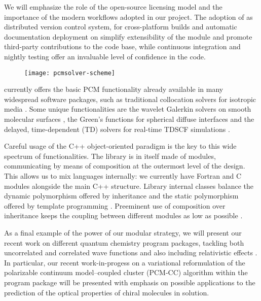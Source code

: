 We will emphasize the role of the open-source licensing model and the
importance of the modern workflows adopted in our project.  The adoption
of \git as distributed version control system, \cmake for cross-platform builds and automatic
documentation deployment on \readthedocs simplify extensibility of the
module and promote third-party contributions to the code base, while
continuous integration and nightly testing offer an invaluable level of
confidence in the code.

\begin{figure}[!htb]
  \centering
  \texttt{[image: pcmsolver-scheme]}
\end{figure}

\pcmsolver currently offers the basic PCM functionality already
available in many widespread software packages, such as traditional
collocation solvers for isotropic media \cite{Tomasi2005}.  Some unique
functionalities are the wavelet Galerkin solvers on smooth molecular
surfaces \cite{Weijo2010, Bugeanu2015}, the Green’s
functions for spherical diffuse interfaces \cite{Mozgawa2015}
and the delayed, time-dependent (TD) solvers for real-time TDSCF
simulations \cite{Corni2015}.

Careful usage of the C++ object-oriented paradigm is the key to this
wide spectrum of functionalities. The library is in itself made of
modules, communicating by means of composition at the outermost
level of the design.
This allows us to mix languages internally: we currently have Fortran
and C modules alongside the main C++ structure.
Library internal classes balance the dynamic polymorphism offered by
inheritance and the static polymorphism offered by template programming
\cite{Alexandrescu2001, Sutter2004}.
Preeminent use of composition over inheritance keeps the coupling
between different modules as low as possible \cite{Gamma1994}.

As a final example of the power of our modular strategy, we will present
our recent work on different quantum chemistry program packages,
tackling both uncorrelated and correlated wave functions \cite{DALTON,
PSI4} and also including relativistic effects \cite{DIRAC14brief,
DiRemigio2014}.  In particular, our recent work-in-progess on a
variational reformulation of the polarizable continuum model--coupled
cluster (PCM-CC) algorithm \cite{Cammi2009, Lipparini2011, Caricato2010a} within the
\psicode{} program package will be presented with emphasis on possible
applications to the prediction of the optical properties of chiral
molecules in solution.


